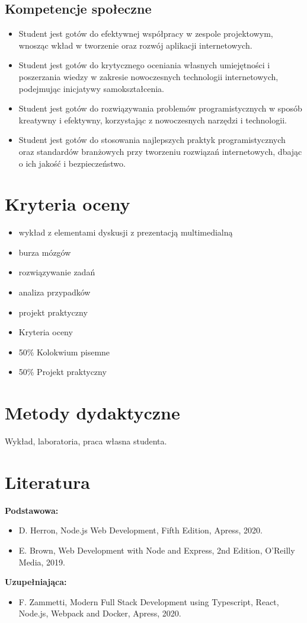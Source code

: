 \documentclass[12pt, a4paper]{article}
\begin{document}
\subsection*{Kompetencje społeczne}
\begin{itemize}
  \item Student jest gotów do efektywnej współpracy w zespole projektowym, wnosząc wkład w tworzenie oraz rozwój aplikacji internetowych.
  \item Student jest gotów do krytycznego oceniania własnych umiejętności i poszerzania wiedzy w zakresie nowoczesnych technologii internetowych, podejmując inicjatywy samokształcenia.
  \item Student jest gotów do rozwiązywania problemów programistycznych w sposób kreatywny i efektywny, korzystając z nowoczesnych narzędzi i technologii.
  \item Student jest gotów do stosowania najlepszych praktyk programistycznych oraz standardów branżowych przy tworzeniu rozwiązań internetowych, dbając o ich jakość i bezpieczeństwo.
\end{itemize}

\section{Kryteria oceny}

\begin{itemize}
  \item wykład z elementami dyskusji z prezentacją multimedialną
  \item burza mózgów
  \item rozwiązywanie zadań
  \item analiza przypadków
  \item projekt praktyczny
  \item Kryteria oceny
  \item 50\% Kolokwium pisemne
  \item 50\% Projekt praktyczny
\end{itemize}

\section{Metody dydaktyczne}

Wykład, laboratoria, praca własna studenta.

\section{Literatura}

\textbf{Podstawowa:}
\begin{itemize}
  \item D. Herron, Node.js Web Development, Fifth Edition, Apress, 2020.
  \item E. Brown, Web Development with Node and Express, 2nd Edition, O’Reilly Media, 2019.
\end{itemize}

\textbf{Uzupełniająca:}
\begin{itemize}
  \item F. Zammetti, Modern Full Stack Development using Typescript, React, Node.js, Webpack and Docker, Apress, 2020.
\end{itemize}
\end{document}
